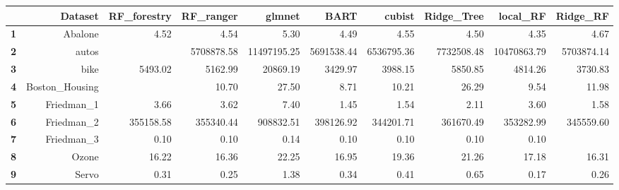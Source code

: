 \begin{table}[ht]
\begin{flushleft}
\begin{tabular}{rrrrrrrrrr}
  \hline
 & Dataset & RF_forestry & RF_ranger & glmnet & BART & cubist & Ridge_Tree & local_RF & Ridge_RF \\ 
  \hline
{\textbf{1}} & Abalone & 4.52 & 4.54 & 5.30 & 4.49 & 4.55 & 4.50 & 4.35 & 4.67 \\ 
  {\textbf{2}} & autos &  & 5708878.58 & 11497195.25 & 5691538.44 & 6536795.36 & 7732508.48 & 10470863.79 & 5703874.14 \\ 
  {\textbf{3}} & bike & 5493.02 & 5162.99 & 20869.19 & 3429.97 & 3988.15 & 5850.85 & 4814.26 & 3730.83 \\ 
  {\textbf{4}} & Boston_Housing &  & 10.70 & 27.50 & 8.71 & 10.21 & 26.29 & 9.54 & 11.98 \\ 
  {\textbf{5}} & Friedman_1 & 3.66 & 3.62 & 7.40 & 1.45 & 1.54 & 2.11 & 3.60 & 1.58 \\ 
  {\textbf{6}} & Friedman_2 & 355158.58 & 355340.44 & 908832.51 & 398126.92 & 344201.71 & 361670.49 & 353282.99 & 345559.60 \\ 
  {\textbf{7}} & Friedman_3 & 0.10 & 0.10 & 0.14 & 0.10 & 0.10 & 0.10 & 0.10 &  \\ 
  {\textbf{8}} & Ozone & 16.22 & 16.36 & 22.25 & 16.95 & 19.36 & 21.26 & 17.18 & 16.31 \\ 
  {\textbf{9}} & Servo & 0.31 & 0.25 & 1.38 & 0.34 & 0.41 & 0.65 & 0.17 & 0.26 \\ 
   \hline
\end{tabular}
\end{flushleft}
\end{table}
